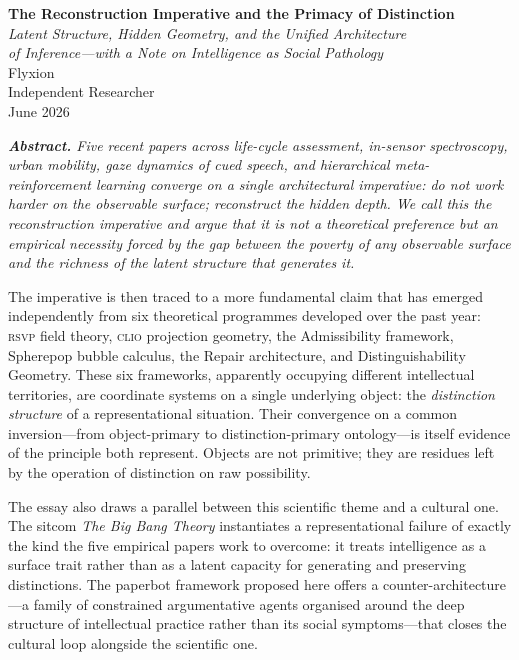 \documentclass[12pt, letterpaper]{article}
\theoremstyle{remark}
\newcommand{\rsvp}{\textsc{rsvp}}
\newcommand{\clio}{\textsc{clio}}
\newcommand{\BBT}{\textit{The Big Bang Theory}}
\begin{document}
\begin{titlepage}
\vspace*{1.8cm}
\begin{center}
{\LARGE\bfseries The Reconstruction Imperative and the Primacy of Distinction}\\[0.5em]
{\large\itshape Latent Structure, Hidden Geometry, and the Unified Architecture\\[0.2em]
of Inference---with a Note on Intelligence as Social Pathology}\\[2.2em]
{\normalsize Flyxion}\\[0.5em]
{\small Independent Researcher}\\[1.8em]
{\small June 2026}\\[3em]
\begin{minipage}{0.80\textwidth}
\small\itshape
\textbf{Abstract.}
Five recent papers across life-cycle assessment, in-sensor spectroscopy,
urban mobility, gaze dynamics of cued speech, and hierarchical
meta-reinforcement learning converge on a single architectural imperative:
do not work harder on the observable surface; reconstruct the hidden depth.
We call this the \emph{reconstruction imperative} and argue that it is not a
theoretical preference but an empirical necessity forced by the gap between
the poverty of any observable surface and the richness of the latent
structure that generates it.

The imperative is then traced to a more fundamental claim that has emerged
independently from six theoretical programmes developed over the past year:
\rsvp{} field theory, \clio{} projection geometry, the Admissibility
framework, Spherepop bubble calculus, the Repair architecture, and
Distinguishability Geometry.  These six frameworks, apparently occupying
different intellectual territories, are coordinate systems on a single
underlying object: the \emph{distinction structure} of a representational
situation.  Their convergence on a common inversion---from object-primary
to distinction-primary ontology---is itself evidence of the principle
both represent.  Objects are not primitive; they are residues left by the
operation of distinction on raw possibility.

The essay also draws a parallel between this scientific theme and a
cultural one.  The sitcom \BBT{} instantiates a representational failure
of exactly the kind the five empirical papers work to overcome: it treats
intelligence as a surface trait rather than as a latent capacity for
generating and preserving distinctions.  The paperbot framework proposed
here offers a counter-architecture---a family of constrained argumentative
agents organised around the deep structure of intellectual practice rather
than its social symptoms---that closes the cultural loop alongside the
scientific one.
\end{minipage}
\end{center}
\end{titlepage}
\end{document}
